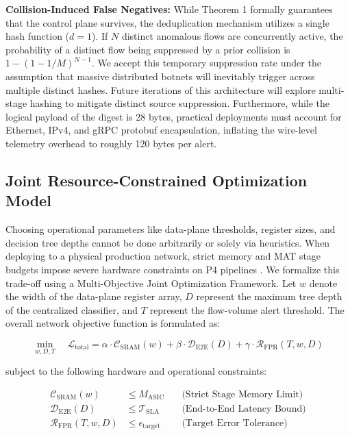 \documentclass[sigconf, nonacm]{acmart}
\begin{document}
\textbf{Collision-Induced False Negatives:} While Theorem 1 formally guarantees that the control plane survives, the deduplication mechanism utilizes a single hash function ($d=1$). If $N$ distinct anomalous flows are concurrently active, the probability of a distinct flow being suppressed by a prior collision is $1 - (1 - 1/M)^{N-1}$. We accept this temporary suppression rate under the assumption that massive distributed botnets will inevitably trigger across multiple distinct hashes. Future iterations of this architecture will explore multi-stage hashing to mitigate distinct source suppression. Furthermore, while the logical payload of the digest is 28 bytes, practical deployments must account for Ethernet, IPv4, and gRPC protobuf encapsulation, inflating the wire-level telemetry overhead to roughly 120 bytes per alert.

\subsection{Joint Resource-Constrained Optimization Model}
Choosing operational parameters like data-plane thresholds, register sizes, and decision tree depths cannot be done arbitrarily or solely via heuristics. When deploying to a physical production network, strict memory and MAT stage budgets impose severe hardware constraints on P4 pipelines \cite{abhashkumar2017}. We formalize this trade-off using a Multi-Objective Joint Optimization Framework. Let $w$ denote the width of the data-plane register array, $D$ represent the maximum tree depth of the centralized classifier, and $T$ represent the flow-volume alert threshold. The overall network objective function is formulated as:

\begin{equation}
\min_{w, D, T} \quad \mathcal{L}_{\text{total}} = \alpha \cdot \mathcal{C}_{\text{SRAM}}(w) + \beta \cdot \mathcal{D}_{\text{E2E}}(D) + \gamma \cdot \mathcal{R}_{\text{FPR}}(T, w, D)
\end{equation}

\noindent subject to the following hardware and operational constraints:

\begin{align}
\mathcal{C}_{\text{SRAM}}(w) &\le M_{\text{ASIC}} \quad &\text{(Strict Stage Memory Limit)} \\
\mathcal{D}_{\text{E2E}}(D) &\le \mathcal{T}_{\text{SLA}} \quad &\text{(End-to-End Latency Bound)} \\
\mathcal{R}_{\text{FPR}}(T, w, D) &\le \epsilon_{\text{target}} \quad &\text{(Target Error Tolerance)}
\end{align}
\end{document}
